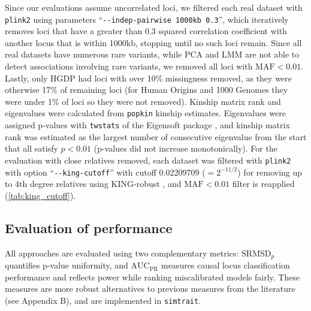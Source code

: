 \documentclass[11pt]{article}
\newcommand{\rmsd}{\text{SRMSD}_p}
\newcommand{\auc}{\text{AUC}_\text{PR}}
\begin{document}
\begin{linenumbers}
Since our evaluations assume uncorrelated loci, we filtered each real dataset with \texttt{plink2} using parameters ``\texttt{-{}-indep-pairwise 1000kb 0.3}'', which iteratively removes loci that have a greater than 0.3 squared correlation coefficient with another locus that is within 1000kb, stopping until no such loci remain.
Since all real datasets have numerous rare variants, while PCA and LMM are not able to detect associations involving rare variants, we removed all loci with $\text{MAF} < 0.01$.
Lastly, only HGDP had loci with over 10\% missingness removed, as they were otherwise 17\% of remaining loci (for Human Origins and 1000 Genomes they were under 1\% of loci so they were not removed).
Kinship matrix rank and eigenvalues were calculated from \texttt{popkin} kinship estimates.
Eigenvalues were assigned p-values with \texttt{twstats} of the Eigensoft package \citep{patterson_population_2006}, and kinship matrix rank was estimated as the largest number of consecutive eigenvalue from the start that all satisfy $p < 0.01$ (p-values did not increase monotonically).
For the evaluation with close relatives removed, each dataset was filtered with \texttt{plink2} with option ``\texttt{-{}-king-cutoff}'' with cutoff 0.02209709 ($= 2^{-11/2}$) for removing up to 4th degree relatives using KING-robust \citep{manichaikul_robust_2010}, and $\text{MAF} < 0.01$ filter is reapplied (\cref{tab:king_cutoff}).

\subsection{Evaluation of performance}

All approaches are evaluated using two complementary metrics: $\rmsd$ quantifies p-value uniformity, and $\auc$ measures causal locus classification performance and reflects power while ranking miscalibrated models fairly.
These measures are more robust alternatives to previous measures from the literature (see Appendix B), and are implemented in \texttt{simtrait}.


\end{linenumbers}
\end{document}
